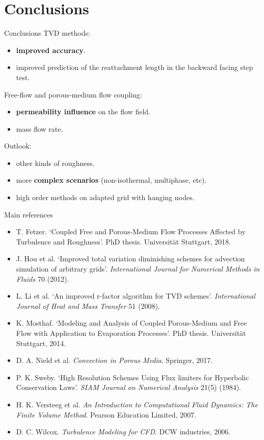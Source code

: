 \documentclass{beamer}
\begin{document}
\section{Conclusions}
\begin{frame}{Conclusions}
TVD methods:
\begin{itemize}
	\item \textbf{improved accuracy}.
	\item improved prediction of the reattachment length in the backward facing step test.
\end{itemize}
Free-flow and porous-medium flow coupling:
\begin{itemize}
	\item \textbf{permeability influence} on the flow field.
	\item mass flow rate.
\end{itemize}
\pause
Outlook:
\begin{itemize}
	\item other kinds of roughness.
	\item more \textbf{complex scenarios} (non-isothermal, multiphase, etc).
	\item high order methods on adapted grid with hanging nodes.
\end{itemize}
\end{frame}
\begin{frame}{Main references}
\begin{itemize}
	\footnotesize
	\item T. Fetzer. `Coupled Free and Porous-Medium Flow Processes Affected by 
	Turbulence and Roughness'. PhD thesis. Universit\"at Stuttgart, 2018.
	\item J. Hou et al. `Improved total variation diminishing schemes for 
	advection simulation of arbitrary grids'. \emph{International Journal for 
		Numerical Methods in Fluids} 70 (2012).
	\item L. Li et al. `An improved r-factor algorithm for TVD schemes'. 
	\emph{International Journal of Heat and Mass Transfer} 51 (2008).
	\item K. Mosthaf. `Modeling and Analysis of Coupled  Porous-Medium and Free 
	Flow with Application to Evaporation Processes'. PhD thesis. Universit\"at 
	Stuttgart, 2014.
	\item D. A. Nield et al. \emph{Convection in Porous Media}. Springer, 2017.
	\item P. K. Sweby. `High Resolution Schemes Using Flux limiters for 
	Hyperbolic Conservation Laws'. \emph{SIAM Journal on Numerical Analysis} 
	21(5) (1984).
	\item H. K. Versteeg et al. \emph{An Introduction to Computational Fluid 
		Dynamics: The Finite Volume Method}. Pearson Education Limited, 2007.
	\item D. C. Wilcox. \emph{Turbulence Modeling for CFD}. DCW industries, 
	2006. 
\end{itemize}
\end{frame}
\end{document}
